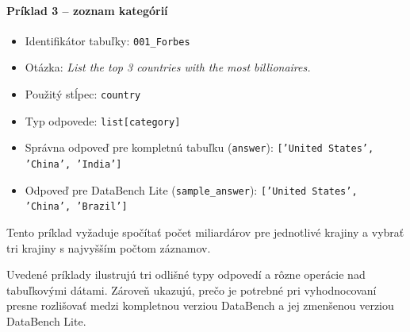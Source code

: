 \paragraph{Príklad 3 -- zoznam kategórií}
\begin{itemize}
    \item Identifikátor tabuľky: \texttt{001\_Forbes}
    \item Otázka: \emph{List the top 3 countries with the most billionaires.}
    \item Použitý stĺpec: \texttt{country}
    \item Typ odpovede: \texttt{list[category]}
    \item Správna odpoveď pre kompletnú tabuľku (\texttt{answer}): \texttt{['United States', 'China', 'India']}
    \item Odpoveď pre DataBench Lite (\texttt{sample\_answer}): \texttt{['United States', 'China', 'Brazil']}
\end{itemize}
Tento príklad vyžaduje spočítať počet miliardárov pre jednotlivé krajiny a vybrať tri krajiny s najvyšším počtom záznamov.

Uvedené príklady ilustrujú tri odlišné typy odpovedí a rôzne operácie nad tabuľkovými dátami. Zároveň ukazujú, prečo je potrebné pri vyhodnocovaní presne rozlišovať medzi kompletnou verziou DataBench a jej zmenšenou verziou DataBench Lite.